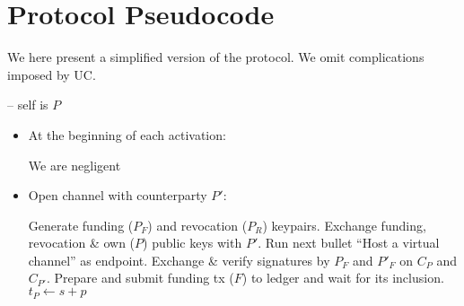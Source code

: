 \section{Protocol Pseudocode}
\label{sec:pseudocode}

We here present a simplified version of the \pchan protocol. We omit
complications imposed by UC.
\ \\

\begin{center}
  \begin{processbox}{\pchan -- self is $P$}
    \begin{itemize}
      \item At the beginning of each activation:
      \begin{algorithmic}[0]
          \State We are negligent 
        \EndIf
      \end{algorithmic}

      \item Open channel with counterparty $P'$: 
      \begin{algorithmic}[0]
        \State Generate funding ($P_F$) and revocation ($P_R$) keypairs.
        \State Exchange funding, revocation \& own ($P$) public keys with $P'$.
          \State Run next bullet ``Host a virtual channel'' as endpoint.
        \EndIf
        \State Exchange \& verify signatures by $P_F$ and $P'_F$ on
        $C_P$ and $C_{P'}$.
          \State Prepare and submit funding tx ($F$) to ledger and wait for
          its inclusion. 
          \State $t_P \gets s + p$ 
          \State {}
        \EndIf
      \end{algorithmic}


\end{itemize}
\end{processbox}
\end{center}
